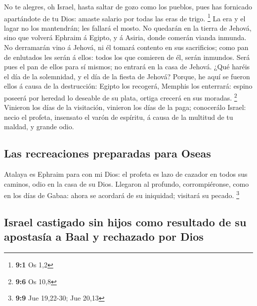  No te alegres, oh Israel, hasta saltar de gozo como los
pueblos, pues has fornicado apartándote de tu Dios: amaste salario por
todas las eras de trigo. \footnote{\textbf{9:1} Os 1,2} 
La era y el lagar no los mantendrán; les fallará el mosto.
 No quedarán en la tierra de Jehová, sino que volverá
Ephraim á Egipto, y á Asiria, donde comerán vianda inmunda.
 No derramarán vino á Jehová, ni él tomará contento en sus
sacrificios; como pan de enlutados les serán á ellos: todos los que
comieren de él, serán inmundos. Será pues el pan de ellos para sí
mismos; no entrará en la casa de Jehová.  ¿Qué haréis el
día de la solemnidad, y el día de la fiesta de Jehová? 
Porque, he aquí se fueron ellos á causa de la destrucción: Egipto los
recogerá, Memphis los enterrará: espino poseerá por heredad lo deseable
de su plata, ortiga crecerá en sus moradas. \footnote{\textbf{9:6} Os
  10,8}  Vinieron los días de la visitación, vinieron los
días de la paga; conocerálo Israel: necio el profeta, insensato el varón
de espíritu, á causa de la multitud de tu maldad, y grande odio.

\hypertarget{las-recreaciones-preparadas-para-oseas}{%
\subsection{Las recreaciones preparadas para
Oseas}\label{las-recreaciones-preparadas-para-oseas}}

 Atalaya es Ephraim para con mi Dios: el profeta es lazo
de cazador en todos sus caminos, odio en la casa de su Dios.
 Llegaron al profundo, corrompiéronse, como en los días de
Gabaa: ahora se acordará de su iniquidad; visitará su pecado.
\footnote{\textbf{9:9} Jue 19,22-30; Jue 20,13}

\hypertarget{israel-castigado-sin-hijos-como-resultado-de-su-apostasuxeda-a-baal-y-rechazado-por-dios}{%
\subsection{Israel castigado sin hijos como resultado de su apostasía a
Baal y rechazado por
Dios}\label{israel-castigado-sin-hijos-como-resultado-de-su-apostasuxeda-a-baal-y-rechazado-por-dios}}

